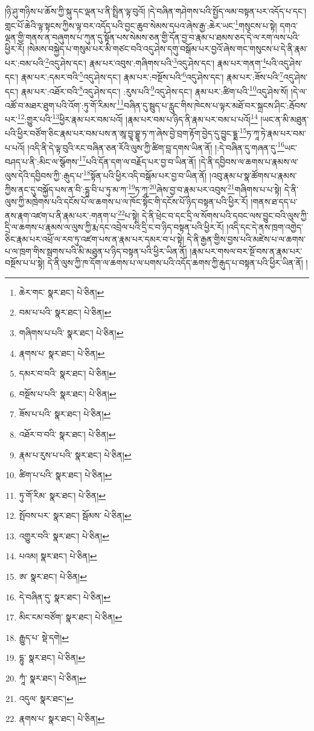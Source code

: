 །ཉི་ཤུ་གཉིས་པ་ཆོས་ཀྱི་སྐུ་དང་ལྡན་པ་ནི་སྤྲིན་ལྟ་བུའོ། །དེ་བཞིན་གཤེགས་པའི་སྤྱོད་ལམ་བསྟན་པར་འདོད་པ་དང་། གླང་པོ་ཆེའི་ལྟ་སྟངས་ཀྱིས་ལྟ་བར་འདོད་པའི་བྱང་ཆུབ་སེམས་དཔའ་ཞེས་རྒྱ་:ཆེར་ཡང་\footnote{ཆེར་གང་  སྣར་ཐང་།  པེ་ཅིན། }གསུངས་པ་སྟེ། དགའ་ལྡན་གྱི་གནས་ན་བཞུགས་པ་ཀུན་དུ་སྟོན་པས་སེམས་ཅན་གྱི་དོན་བྱ་བ་རྣམ་པ་ཐམས་ཅད་དེ་ལ་རག་ལས་པའི་ཕྱིར་རོ། །སེམས་བསྐྱེད་པ་གསུམ་པར་མི་གཙང་བའི་འདུ་ཤེས་དགུ་བསྒོམ་པར་བྱའོ་ཞེས་གང་གསུངས་པ་དེ་ནི་རྣམ་པར་:བམ་པའི་\footnote{བམ་པ་པའི་  སྣར་ཐང་།  པེ་ཅིན། }འདུ་ཤེས་དང་། རྣམ་པར་འབུས་:གཞིགས་པའི་\footnote{གཞིགས་པ་པའི་  སྣར་ཐང་།  པེ་ཅིན། }འདུ་ཤེས་དང་། རྣམ་པར་གནག་\footnote{རྣགས་པ་  སྣར་ཐང་།  པེ་ཅིན། }པའི་འདུ་ཤེས་དང་། རྣམ་པར་:དམར་བའི་\footnote{དམར་བ་བའི་  སྣར་ཐང་།  པེ་ཅིན། }འདུ་ཤེས་དང་། རྣམ་པར་:བསྔོས་པའི་\footnote{བསྔོས་པ་པའི་  སྣར་ཐང་།  པེ་ཅིན། }འདུ་ཤེས་དང་། རྣམ་པར་:ཟོས་པའི་\footnote{ཟོས་པ་པའི་  སྣར་ཐང་།  པེ་ཅིན། }འདུ་ཤེས་དང་། རྣམ་པར་:འཐོར་བའི་\footnote{འཐོར་བ་བའི་  སྣར་ཐང་།  པེ་ཅིན། }འདུ་ཤེས་དང་། :རུས་པའི་\footnote{རྣམ་པ་རུས་པ་པའི་  སྣར་ཐང་།  པེ་ཅིན། }འདུ་ཤེས་དང་། རྣམ་པར་:ཚིག་པའི་\footnote{ཚིག་པ་པའི་  སྣར་ཐང་།  པེ་ཅིན། }འདུ་ཤེས་སོ། །དེ་ལ་འཚོ་བ་མཐར་ཐུག་པའི་འོག་:ཏུ་གོ་རིམས་\footnote{ཏུ་གོ་རིམ་  སྣར་ཐང་།  པེ་ཅིན། }བཞིན་དུ་སྦུད་པ་རླུང་གིས་ཁེངས་པ་ལྟར་མཐོ་བར་སྐྲངས་ཤིང་:རྦོབས་པར་\footnote{སྤོབས་པར་  སྣར་ཐང་། སྦོམས་  པེ་ཅིན། }:གྱུར་པའི་\footnote{འགྱུར་བའི་  སྣར་ཐང་།  པེ་ཅིན། }ཕྱིར་རྣམ་པར་བམ་པའོ། །རྣམ་པར་བམ་པ་ཉིད་ནི་རྣམ་པར་བམ་པ་པའོ།\footnote{པའམ།  སྣར་ཐང་།  པེ་ཅིན། } །ཡང་ན་མི་མཐུན་པའི་ཕྱིར་བཙོག་ཅིང་རྣམ་པར་བམ་པས་ན་ཨཱ་བྱཱ་བྷྱཱ་ཏ་ཀ་ཞེས་བྱེ་བྲག་རྟོག་བྱེད་དུ་བྱུང་དྷྨ་\footnote{ཨ་  སྣར་ཐང་།  པེ་ཅིན། }ཏ་ཀཱ་ཏེ་རྣམ་པར་བམ་པ་པའོ། །འདི་ནི་དེ་ལྟ་བུའི་རང་བཞིན་ཅན་རོའི་ལུས་ཀྱི་ཚིག་བླ་དགས་ཡིན་ནོ། །:དེ་བཞིན་དུ་གཞན་དུ་\footnote{དེ་བཞིན་དུ་  སྣར་ཐང་།  པེ་ཅིན། }ཡང་བཤད་པ་ནི་:མིང་ལ་སྩོགས་\footnote{མིང་ངམ་བཙོག་  སྣར་ཐང་།  པེ་ཅིན། }པའི་དོན་དག་ལ་བརྗོད་པར་བྱ་བ་ཡིན་ནོ། །དེ་ནི་དབྱིབས་ལ་ཆགས་པ་རྣམས་ལ་ལུས་དེའི་དབྱིབས་ཀྱི་:རྒུད་པ་\footnote{རྒྱུད་པ་  སྡེ་དགེ། }སྟོན་པའི་ཕྱིར་འདི་བསྒོམ་པར་བྱ་བ་ཡིན་ནོ། །འབུ་རྣམ་པ་སྣ་ཚོགས་པ་རྣམས་ཀྱིས་ནང་དུ་བསྐྱོད་པས་ན་བི་:དྷུ་བི་པ་ཏུ་མ་ཀ་\footnote{དྷུ་  སྣར་ཐང་།  པེ་ཅིན། }ཏ་ཀཱ་\footnote{ཀཱཾ་  སྣར་ཐང་།  པེ་ཅིན། }ཞེས་བྱ་བ་རྣམ་པར་འབུས་\footnote{འདུལ་  སྣར་ཐང་། }གཞིགས་པ་པ་སྟེ། དེ་ནི་ལུས་ཀྱི་མཁྲེགས་པའི་དངོས་པོ་ལ་ཆགས་པ་ལ་ཁོང་སྟོང་གི་དངོས་པོ་ཉིད་བསྟན་པའི་ཕྱིར་རོ། །གནས་ཐ་དད་པ་ནས་རྣག་འཛག་པ་ནི་རྣམ་པར་:གནག་པ་\footnote{རྣགས་པ་  སྣར་ཐང་།  པེ་ཅིན། }པ་སྟེ། དེ་ནི་ཕྲེང་བ་དང་དྲི་ལ་སོགས་པའི་དབང་ལས་བྱུང་བའི་ལུས་ཀྱི་དྲི་ལ་ཆགས་པ་རྣམས་ལ་ལུས་ཀྱི་རྨ་དང་འབྲེལ་པའི་དྲི་ང་བ་ཉིད་བསྟན་པའི་ཕྱིར་རོ། །འདི་དང་དེ་ནས་ཁྲག་འགྱེད་ཅིང་རྣམ་པར་འཕྲོ་ལ་རབ་ཏུ་འཛག་པས་ན་རྣམ་པར་དམར་བ་པ་སྟེ། དེ་ནི་རྒྱན་གྱིས་བྱས་པའི་མཛེས་པ་ལ་ཆགས་པ་ལ་ཁྲག་གིས་སྦགས་པའི་མི་མཐུན་པ་ཉིད་བསྟན་པའི་ཕྱིར་ཡིན་ནོ། །རྣམ་པར་གསལ་བར་སྔོ་བས་ན་རྣམ་པར་བསྔོས་པ་པ་སྟེ། དེ་ནི་ལུས་ཀྱི་ཁ་དོག་ལ་ཆགས་པ་ལ་པགས་པའི་འདོད་ཆགས་ཀྱི་རྒུད་པ་བསྟན་པའི་ཕྱིར་ཡིན་ནོ། །
